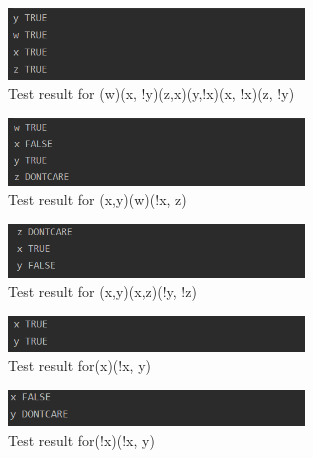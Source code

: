 \documentclass{article}
\begin{document}
				\begin{figure}[H]
					\centering
			 			\includegraphics[width=0.7\textwidth]{dplltest6.png}
			 			\centering
			  			\caption{Test result for (w)(x, !y)(z,x)(y,!x)(x, !x)(z, !y)}
			  			\label{fig:dplltest6}
					\end{figure}	

				\begin{figure}[H]
					\centering
			 			\includegraphics[width=0.7\textwidth]{dplltest7.png}
			 			\centering
			  			\caption{Test result for (x,y)(w)(!x, z)}
			  			\label{fig:dplltest7}
					\end{figure}	
										
				\begin{figure}[H]
					\centering
			 			\includegraphics[width=0.7\textwidth]{dplltest8.png}
			 			\centering
			  			\caption{Test result for (x,y)(x,z)(!y, !z)}
			  			\label{fig:dplltest8}
					\end{figure}	
					
				\begin{figure}[H]
					\centering
			 			\includegraphics[width=0.7\textwidth]{dplltest9.png}
			 			\centering
			  			\caption{Test result for(x)(!x, y)}
			  			\label{fig:dplltest9}
					\end{figure}						
		
								\begin{figure}[H]
					\centering
			 			\includegraphics[width=0.7\textwidth]{dplltest10.png}
			 			\centering
			  			\caption{Test result for(!x)(!x, y)}
			  			\label{fig:dplltest10}
					\end{figure}		
					
\end{document}
